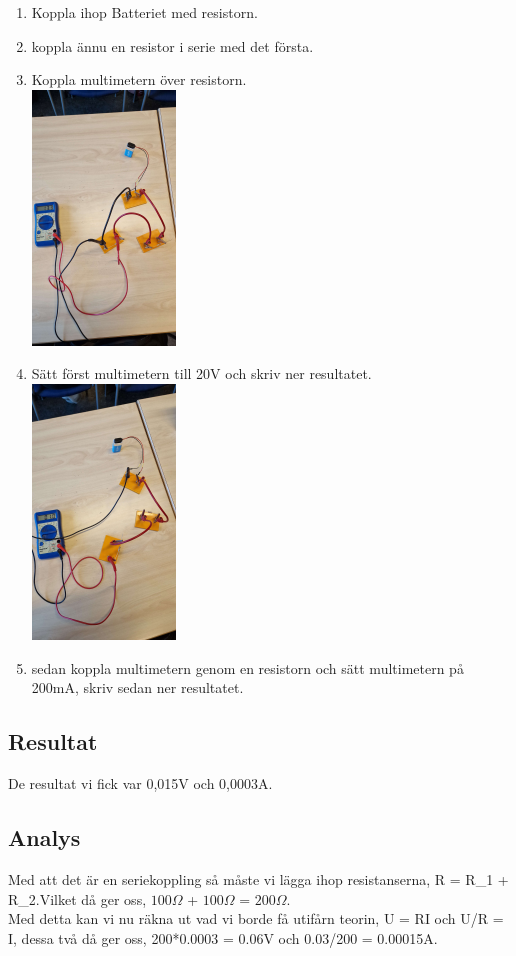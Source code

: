 \documentclass[11p]{article}
\begin{document}
    \begin{enumerate}
        \item Koppla ihop Batteriet med resistorn.
        \item koppla ännu en resistor i serie med det första.
        \item Koppla multimetern över resistorn.
        \\
        \includegraphics[width=0.3\textwidth]{images/2Volt.jpg}
        \item Sätt först multimetern till 20V och skriv ner resultatet.
        \\
        \includegraphics[width=0.3\textwidth]{images/2Ampere.jpg}
        \item sedan koppla multimetern genom en resistorn och sätt multimetern på 200mA, skriv sedan ner resultatet.
    \end{enumerate}

    \subsection{Resultat}
    De resultat vi fick var 0,015V och 0,0003A.

    \subsection{Analys}
    Med att det är en seriekoppling så måste vi lägga ihop resistanserna, R = R_1 + R_2.Vilket då ger oss, $100\Omega$ + $100\Omega$ = $200\Omega$.\\
    Med detta kan vi nu räkna ut vad vi borde få utifårn teorin, U = RI och U/R = I, dessa två då ger oss, 200*0.0003 = 0.06V och 0.03/200 = 0.00015A.
\end{document}
